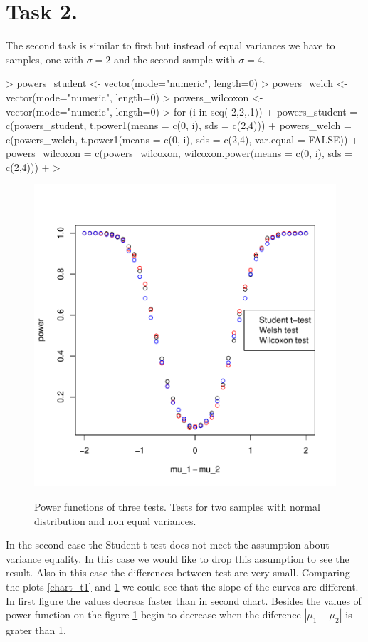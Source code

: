 \documentclass{article}
\begin{document}
  \section{Task 2.}
 The second task is similar to first but instead of equal variances we have to samples, one with $\sigma=2$ and the second sample with $\sigma=4$.
\begin{Schunk}
\begin{Sinput}
>   powers_student <- vector(mode="numeric", length=0)
>   powers_welch <- vector(mode="numeric", length=0)
>   powers_wilcoxon <- vector(mode="numeric", length=0)
>   for (i in seq(-2,2,.1)){
+     powers_student = c(powers_student, t.power1(means = c(0, i), sds = c(2,4)))
+     powers_welch = c(powers_welch, t.power1(means = c(0, i), sds = c(2,4), var.equal = FALSE))
+     powers_wilcoxon = c(powers_wilcoxon, wilcoxon.power(means = c(0, i), sds = c(2,4)))
+   }
> 
\end{Sinput}
\end{Schunk}
\begin{figure}
\center
\includegraphics{p1-task_2_plot}
\label{chart_t2}
\caption{Power functions of three tests. Tests for two samples with normal distribution and non equal variances.}
\end{figure}
In the second case the Student t-test does not meet the assumption about variance equality. In this case we would like to drop this assumption to see the result. Also in this case the differences between test are very small. Comparing the plots \ref{chart_t1} and \ref{chart_t2} we could see that the slope of the curves are different. In first figure the values decreas faster than in second chart. Besides the values of power function on the figure \ref{chart_t2} begin to decrease when the diference $|\mu_1-\mu_2|$ is grater than 1.
\end{document}
